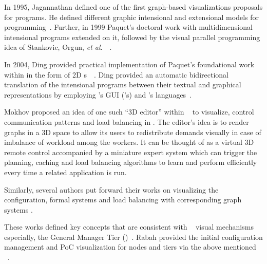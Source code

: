 In 1995, Jagannathan defined one of the first graph-based visualizations 
proposals for {\lucid} programs. He defined different graphic intensional and 
extensional models for {\glu} programming~\cite{glu-graphical-models-1995}. 
Further, in 1999 Paquet's doctoral work with multidimensional intensional programs 
extended on it, followed by the visual parallel programming idea of Stankovic, 
Orgun, \emph{et al}.~\cite{paquetThesis}~\cite{visual-parallel-programming-2002}.

In 2004, Ding provided practical implementation of 
Paquet's foundational work within {\gipsy} in the form of 2D
{\dfg}s~\cite{paquetThesis,yimin04}~\cite{yimin04}. Ding provided an automatic bidirectional 
translation of the intensional programs between their textual and graphical 
representations by employing  's GUI ({\graphviz}'s) and 's
languages~\cite{flucid-dfg-viz-pst2011,graphviz,dot-language}.
 
Mokhov proposed an idea of one such ``3D editor'' within
{\ripe}~\cite{mokhov-mcthesis-book-reprint10} to visualize, control
communication patterns and load balancing in {\gipsy}.
%
The editor's idea is to render graphs in a 3D space to allow its
users to redistribute demands visually in case of imbalance of
workload among the workers.
%
It can be thought of as a virtual 3D remote control accompanied by
a miniature expert system which can trigger the planning, 
caching and load balancing algorithms to learn and perform
efficiently every time a related {\gipsy} application is run.

Similarly, several authors put forward their works on visualizing the 
configuration, formal systems and load balancing with corresponding graph 
systems
\cite{%
sim-viz-resource-alloc-control,%
visual-config-representation,%
logical-reasoning-with-diagrams,%
graph-transform-visual-languages,%
diagramatic-formal-system-euclidean}.

These works defined key concepts that are consistent with
{\gipsy}~\cite{flucid-dfg-viz-pst2011} visual mechanisms especially, the General Manager 
Tier ({\gmt})~\cite{ji-yi-mcthesis-2011}. Rabah provided the initial 
configuration management and PoC visualization for {\gipsy} nodes and tiers 
via the above mentioned {\gmt}~\cite{graph-based-gmt}.


